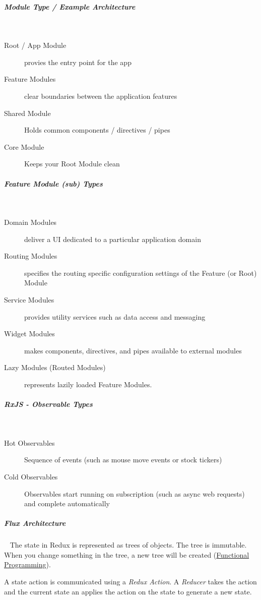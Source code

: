 \documentclass[11pt,twoside,landscape]{article}
\begin{document}
\begin{multicols}{3}
\begin{description}
\end{description}
\subparagraph{Module Type / Example Architecture} \
\label{sec:org500faf1}
\begin{description}
\item[{Root / App Module}] provies the entry point for the app
\item[{Feature Modules}] clear boundaries between the application features
\item[{Shared Module}] Holds common components / directives / pipes
\item[{Core Module}] Keeps your Root Module clean
\end{description}
\subparagraph{Feature Module (sub) Types} \
\label{sec:org95086de}
\begin{description}
\item[{Domain Modules}] deliver a UI dedicated to a particular application domain
\item[{Routing Modules}] specifies the routing specific configuration settings of the Feature (or Root) Module
\item[{Service Modules}] provides utility services such as data access and messaging
\item[{Widget Modules}] makes components, directives, and pipes available to external modules
\item[{Lazy Modules (Routed Modules)}] represents lazily loaded Feature Modules.
\end{description}
\subparagraph{RxJS - Observable Types} \
\label{sec:org24792cb}
\begin{description}
\item[{Hot Observables}] Sequence of events (such as mouse move events or stock tickers)
\item[{Cold Observables}] Observables start running on subscription (such as async web requests) and complete automatically
\end{description}
\subparagraph{Flux Architecture} \
\label{sec:org2ad87e1}
The state in Redux is represented as trees of objects.
The tree is immutable.
When you change something in the tree, a new tree will be created (\href{../../../roam/20220616080932-functional_programming.org}{Functional Programming}).

A state action is communicated using a \emph{Redux Action}.
A \emph{Reducer} takes the action and the current state an applies the action on the state to generate a new state.


\end{multicols}
\end{document}
